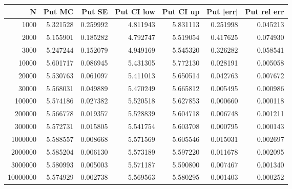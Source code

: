 \begin{tabular}{rrrrrrr}
\toprule
N & Put MC & Put SE & Put CI low & Put CI up & Put |err| & Put rel err \\
\midrule
1000 & 5.321528 & 0.259992 & 4.811943 & 5.831113 & 0.251998 & 0.045213 \\
2000 & 5.155901 & 0.185282 & 4.792747 & 5.519054 & 0.417625 & 0.074930 \\
3000 & 5.247244 & 0.152079 & 4.949169 & 5.545320 & 0.326282 & 0.058541 \\
10000 & 5.601717 & 0.086945 & 5.431305 & 5.772130 & 0.028191 & 0.005058 \\
20000 & 5.530763 & 0.061097 & 5.411013 & 5.650514 & 0.042763 & 0.007672 \\
30000 & 5.568031 & 0.049889 & 5.470249 & 5.665812 & 0.005495 & 0.000986 \\
100000 & 5.574186 & 0.027382 & 5.520518 & 5.627853 & 0.000660 & 0.000118 \\
200000 & 5.566778 & 0.019357 & 5.528839 & 5.604718 & 0.006748 & 0.001211 \\
300000 & 5.572731 & 0.015805 & 5.541754 & 5.603708 & 0.000795 & 0.000143 \\
1000000 & 5.588557 & 0.008668 & 5.571569 & 5.605546 & 0.015031 & 0.002697 \\
2000000 & 5.585204 & 0.006130 & 5.573189 & 5.597220 & 0.011678 & 0.002095 \\
3000000 & 5.580993 & 0.005003 & 5.571187 & 5.590800 & 0.007467 & 0.001340 \\
10000000 & 5.574929 & 0.002738 & 5.569563 & 5.580295 & 0.001403 & 0.000252 \\
\bottomrule
\end{tabular}
